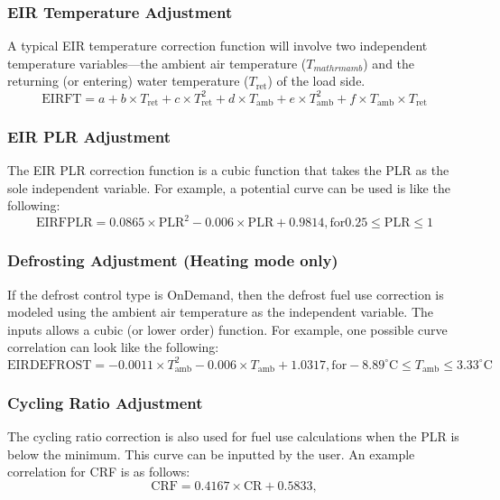 \subsubsection{EIR Temperature Adjustment}
A typical EIR temperature correction function will involve two independent temperature variables---the ambient air temperature ($T_{mathrm{amb}}$) and the returning (or entering) water temperature ($T_{\mathrm{ret}}$) of the load side.
\begin{equation}
\mathrm{EIRFT} = a + b \times T_{\mathrm{ret}} + c \times T_{\mathrm{ret}}^{2} + d \times T_{\mathrm{amb}} + e \times T_{\mathrm{amb}}^{2} + f \times T_{\mathrm{amb}} \times T_{\mathrm{ret}}
\end{equation}

\subsubsection{EIR PLR Adjustment}
The EIR PLR correction function is a cubic function that takes the PLR as the sole independent variable. For example, a potential curve can be used is like the following:
\begin{equation}
\mathrm{EIRFPLR} = 0.0865 \times \mathrm{PLR}^{2} - 0.006 \times \mathrm{PLR} + 0.9814, \mathrm{for } 0.25 \leq \mathrm{PLR} \leq 1
\end{equation}

\subsubsection{Defrosting Adjustment (Heating mode only)}
If the defrost control type is OnDemand, then the defrost fuel use correction is modeled using the ambient air temperature as the independent variable. The inputs allows a cubic (or lower order) function. For example, one possible curve correlation can look like the following:
\begin{equation}
\mathrm{EIRDEFROST} = -0.0011 \times T_{\mathrm{amb}}^{2} - 0.006 \times T_{\mathrm{amb}} + 1.0317, \mathrm{for} -8.89^{\circ}\mathrm{C} \leq T_{\mathrm{amb}} \leq 3.33^{\circ}\mathrm{C}
\end{equation}

\subsubsection{Cycling Ratio Adjustment}
The cycling ratio correction is also used for fuel use calculations when the PLR is below the minimum. This curve can be inputted by the user. An example correlation for CRF is as follows:
\begin{equation}
\mathrm{CRF} = 0.4167 \times \mathrm{CR} + 0.5833,
\end{equation}

